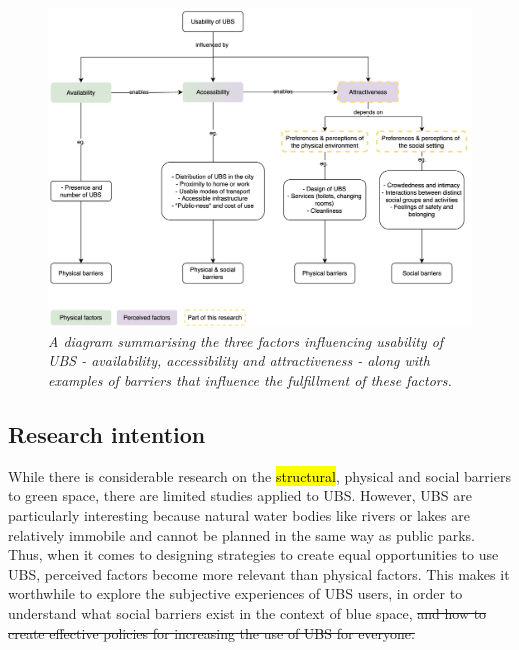 \documentclass{article}
\begin{document}
\begin{figure}[h]
	\includegraphics[width=\textwidth]{diagram_ubs_use.png}
	\caption{\textit{A diagram summarising the three factors influencing usability of UBS - availability, accessibility and attractiveness - along with examples of barriers that influence the fulfillment of these factors.}}
	  \label{fig:diagram_ubs_use}
\end{figure}


\subsection{Research intention}

While there is considerable research on the \hl{structural}, physical and social barriers to green space, there are limited studies applied to UBS.
However, UBS are particularly interesting because natural water bodies like rivers or lakes are relatively immobile and cannot be planned in the same way as public parks.
Thus, when it comes to designing strategies to create equal opportunities to use UBS, perceived factors become more relevant than physical factors. 
This makes it worthwhile to explore the subjective experiences of UBS users, in order to understand what social barriers exist in the context of blue space, \sout{and how to create effective policies for increasing the use of UBS for everyone.}

\end{document}
